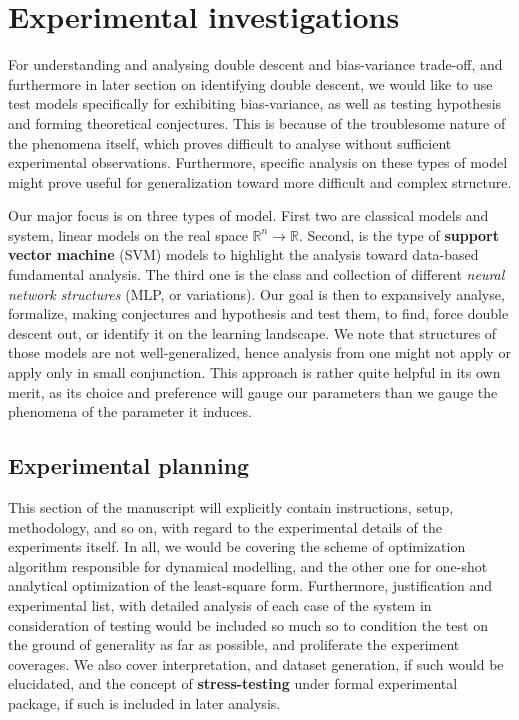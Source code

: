 \chapter{Experimental investigations}

For understanding and analysing double descent and bias-variance trade-off, and furthermore in later section on identifying double descent, we would like to use test models specifically for exhibiting bias-variance, as well as testing hypothesis and forming theoretical conjectures. This is because of the troublesome nature of the phenomena itself, which proves difficult to analyse without sufficient experimental observations. Furthermore, specific analysis on these types of model might prove useful for generalization toward more difficult and complex structure. 

Our major focus is on three types of model. First two are classical models and system, linear models on the real space $\mathbb{R}^{n}\to\mathbb{R}$. Second, is the type of \textbf{support vector machine} (SVM) models to highlight the analysis toward data-based fundamental analysis. The third one is the class and collection of different \textit{neural network structures} (MLP, or variations). Our goal is then to expansively analyse, formalize, making conjectures and hypothesis and test them, to find, force double descent out, or identify it on the learning landscape. We note that structures of those models are not well-generalized, hence analysis from one might not apply or apply only in small conjunction. This approach is rather quite helpful in its own merit, as its choice and preference will gauge our parameters than we gauge the phenomena of the parameter it induces.
\section{Experimental planning}

This section of the manuscript will explicitly contain instructions, setup, methodology, and so on, with regard to the experimental details of the experiments itself. In all, we would be covering the scheme of optimization algorithm responsible for dynamical modelling, and the other one for one-shot analytical optimization of the least-square form. Furthermore, justification and experimental list, with detailed analysis of each case of the system in consideration of testing would be included so much so to condition the test on the ground of generality as far as possible, and proliferate the experiment coverages. We also cover interpretation, and dataset generation, if such would be elucidated, and the concept of \textbf{stress-testing} under formal experimental package, if such is included in later analysis. 

